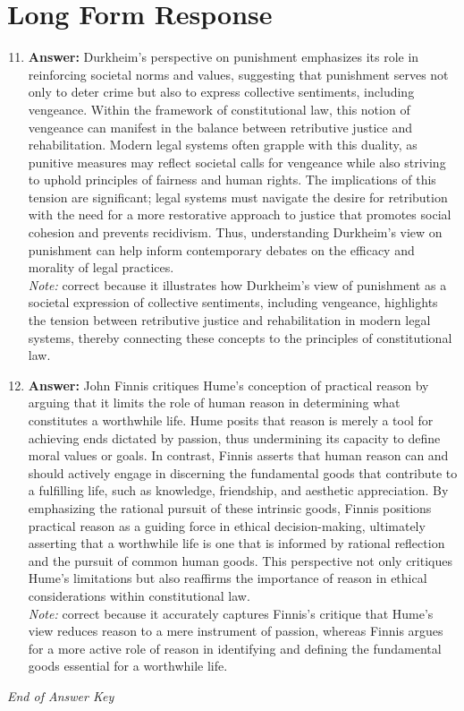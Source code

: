 \documentclass[12pt]{article}
\begin{document}
\section*{Long Form Response}
\begin{enumerate}[label=\arabic*.]
\setcounter{enumi}{10}
\item \textbf{Answer:} Durkheim's perspective on punishment emphasizes its role in reinforcing societal norms and values, suggesting that punishment serves not only to deter crime but also to express collective sentiments, including vengeance. Within the framework of constitutional law, this notion of vengeance can manifest in the balance between retributive justice and rehabilitation. Modern legal systems often grapple with this duality, as punitive measures may reflect societal calls for vengeance while also striving to uphold principles of fairness and human rights. The implications of this tension are significant; legal systems must navigate the desire for retribution with the need for a more restorative approach to justice that promotes social cohesion and prevents recidivism. Thus, understanding Durkheim's view on punishment can help inform contemporary debates on the efficacy and morality of legal practices.
\\ \textit{Note:} correct because it illustrates how Durkheim's view of punishment as a societal expression of collective sentiments, including vengeance, highlights the tension between retributive justice and rehabilitation in modern legal systems, thereby connecting these concepts to the principles of constitutional law.
\item \textbf{Answer:} John Finnis critiques Hume's conception of practical reason by arguing that it limits the role of human reason in determining what constitutes a worthwhile life. Hume posits that reason is merely a tool for achieving ends dictated by passion, thus undermining its capacity to define moral values or goals. In contrast, Finnis asserts that human reason can and should actively engage in discerning the fundamental goods that contribute to a fulfilling life, such as knowledge, friendship, and aesthetic appreciation. By emphasizing the rational pursuit of these intrinsic goods, Finnis positions practical reason as a guiding force in ethical decision-making, ultimately asserting that a worthwhile life is one that is informed by rational reflection and the pursuit of common human goods. This perspective not only critiques Hume's limitations but also reaffirms the importance of reason in ethical considerations within constitutional law.
\\ \textit{Note:} correct because it accurately captures Finnis's critique that Hume's view reduces reason to a mere instrument of passion, whereas Finnis argues for a more active role of reason in identifying and defining the fundamental goods essential for a worthwhile life.
\end{enumerate}

\vfill
\noindent\textit{End of Answer Key}
\end{document}
